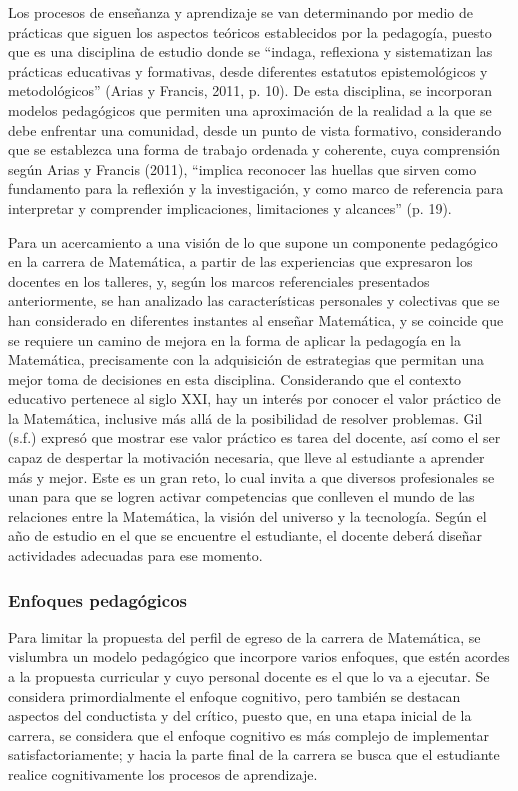 Los procesos de enseñanza y aprendizaje se van determinando por medio de prácticas que siguen los aspectos teóricos establecidos por la pedagogía, puesto que es una disciplina de estudio donde se “indaga, reflexiona y sistematizan las prácticas educativas y formativas, desde diferentes estatutos epistemológicos y metodológicos” (Arias y Francis, 2011, p. 10). De esta disciplina, se incorporan modelos pedagógicos que permiten una aproximación de la realidad a la que se debe enfrentar una comunidad, desde un punto de vista formativo, considerando que se establezca una forma de trabajo ordenada y coherente, cuya comprensión según Arias y Francis (2011), “implica reconocer las huellas que sirven como fundamento para la reflexión y la investigación, y como marco de referencia para interpretar y comprender implicaciones, limitaciones y alcances” (p. 19).

Para un acercamiento a una visión de lo que supone un componente pedagógico en la carrera de Matemática, a partir de las experiencias que expresaron los docentes en los talleres, y, según los marcos referenciales presentados anteriormente, se han analizado las características personales y colectivas que se han considerado en diferentes instantes al enseñar Matemática, y se coincide que se requiere un camino de mejora en la forma de aplicar la pedagogía en la Matemática, precisamente con la adquisición de estrategias que permitan una mejor toma de decisiones en esta disciplina.  
Considerando que el contexto educativo pertenece al siglo XXI, hay un interés por conocer el valor práctico de la Matemática, inclusive más allá de la posibilidad de resolver problemas. Gil (s.f.) expresó que mostrar ese valor práctico es tarea del docente, así como el ser capaz de despertar la motivación necesaria, que lleve al estudiante a aprender más y mejor. Este es un gran reto, lo cual invita a que diversos profesionales se unan para que se logren activar competencias que conlleven el mundo de las relaciones entre la Matemática, la visión del universo y la tecnología. Según el año de estudio en el que se encuentre el estudiante, el docente deberá diseñar actividades adecuadas para ese momento.  


\subsubsection{Enfoques pedagógicos}

Para limitar la propuesta del perfil de egreso de la carrera de Matemática, se vislumbra un modelo pedagógico que incorpore varios enfoques, que estén acordes a la propuesta curricular y cuyo personal docente es el que lo va a ejecutar. Se considera primordialmente el enfoque cognitivo, pero también se destacan aspectos del conductista y del crítico, puesto que, en una etapa inicial de la carrera, se considera que el enfoque cognitivo es más complejo de implementar satisfactoriamente; y hacia la parte final de la carrera se busca que el estudiante realice cognitivamente los procesos de aprendizaje.

